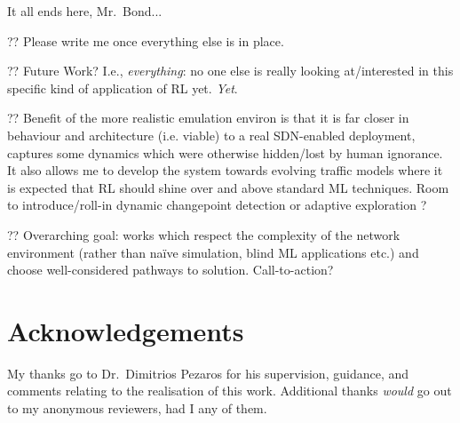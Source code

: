 \documentclass[conference, letterpaper, 10pt, times]{IEEEtran}
\begin{document}
It all ends here, Mr.\ Bond...

?? Please write me once everything else is in place.

?? Future Work? I.e., \emph{everything}: no one else is really looking at/interested in this specific kind of application of RL yet. \emph{Yet}.

?? Benefit of the more realistic emulation environ is that it is far closer in behaviour and architecture (i.e. viable) to a real SDN-enabled deployment, captures some dynamics which were otherwise hidden/lost by human ignorance. It also allows me to develop the system towards evolving traffic models where it is expected that RL should shine over and above standard ML techniques. Room to introduce/roll-in dynamic changepoint detection or adaptive exploration \cite{DBLP:conf/ki/Tokic10, DBLP:conf/ki/TokicP11, DBLP:conf/annpr/TokicP12}?

?? Overarching goal: works which respect the complexity of the network environment (rather than na\"{i}ve simulation, blind ML applications etc.) and choose well-considered pathways to solution. Call-to-action?

\section*{Acknowledgements}
My thanks go to Dr.\ Dimitrios Pezaros for his supervision, guidance, and comments relating to the realisation of this work.
Additional thanks \emph{would} go out to my anonymous reviewers, had I any of them.

\printbibliography
\end{document}
